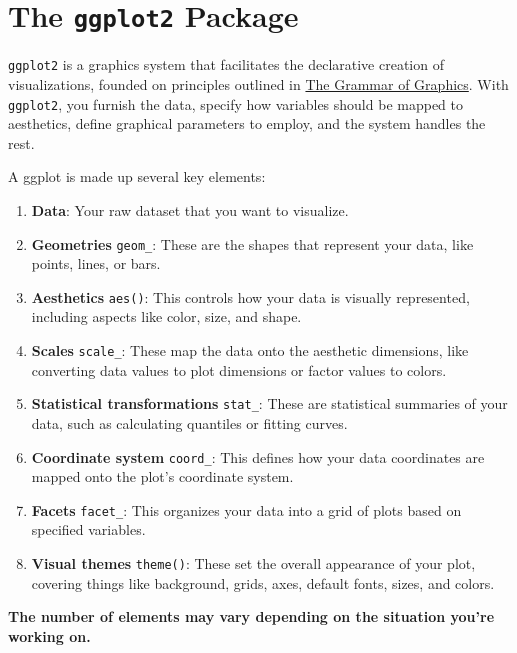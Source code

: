 \documentclass[
  letterpaper,
]{scrbook}
\providecommand{\tightlist}{%
  \setlength{\itemsep}{0pt}\setlength{\parskip}{0pt}}\usepackage{longtable,booktabs,array}
\begin{document}

\chapter{\texorpdfstring{The \texttt{ggplot2}
Package}{The ggplot2 Package}}\label{ggplot}

\texttt{ggplot2} is a graphics system that facilitates the declarative
creation of visualizations, founded on principles outlined in
\href{https://link.springer.com/chapter/10.1007/978-3-642-21551-3_13}{The
Grammar of Graphics}. With \texttt{ggplot2}, you furnish the data,
specify how variables should be mapped to aesthetics, define graphical
parameters to employ, and the system handles the rest.

A ggplot is made up several key elements:

\begin{enumerate}
\def\labelenumi{\arabic{enumi}.}
\tightlist
\item
  \textbf{Data}: Your raw dataset that you want to visualize.
\item
  \textbf{Geometries} \texttt{geom\_}: These are the shapes that
  represent your data, like points, lines, or bars.
\item
  \textbf{Aesthetics} \texttt{aes()}: This controls how your data is
  visually represented, including aspects like color, size, and shape.
\item
  \textbf{Scales} \texttt{scale\_}: These map the data onto the
  aesthetic dimensions, like converting data values to plot dimensions
  or factor values to colors.
\item
  \textbf{Statistical transformations} \texttt{stat\_}: These are
  statistical summaries of your data, such as calculating quantiles or
  fitting curves.
\item
  \textbf{Coordinate system} \texttt{coord\_}: This defines how your
  data coordinates are mapped onto the plot's coordinate system.
\item
  \textbf{Facets} \texttt{facet\_}: This organizes your data into a grid
  of plots based on specified variables.
\item
  \textbf{Visual themes} \texttt{theme()}: These set the overall
  appearance of your plot, covering things like background, grids, axes,
  default fonts, sizes, and colors.
\end{enumerate}

\begin{tcolorbox}[enhanced jigsaw, opacityback=0, toprule=.15mm, colframe=quarto-callout-note-color-frame, bottomrule=.15mm, breakable, arc=.35mm, left=2mm, leftrule=.75mm, rightrule=.15mm, colback=white]
\begin{minipage}[t]{5.5mm}
\textcolor{quarto-callout-note-color}{\faInfo}
\end{minipage}%
\begin{minipage}[t]{\textwidth - 5.5mm}

\textbf{The number of elements may vary depending on the situation
you're working on.}

\end{minipage}%
\end{tcolorbox}
\end{document}
